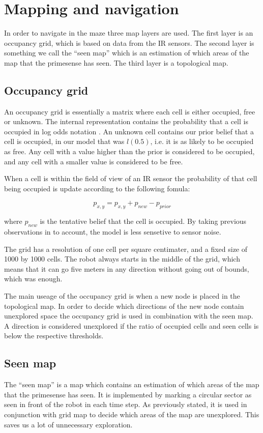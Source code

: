 \section{Mapping and navigation}
In order to navigate in the maze three map layers are used. The first layer is an occupancy grid, which is based on data from the IR sensors. The second layer is something we call the ``seen map'' which is an estimation of which areas of the map that the primesense has seen. The third layer is a topological map.

\subsection{Occupancy grid}
An occupancy grid is essentially a matrix where each cell is either occupied, free or unknown. 
The internal representation contains the probability that a cell is occupied in log odds notation \cite{wiki:Logit}.
An unknown cell contains our prior belief that a cell is occupied, in our model that was $l(0.5)$, i.e. it is as likely to be occupied as free. 
Any cell with a value higher than the prior is considered to be occupied, and any cell with a smaller value is considered to be free.

When a cell is within the field of view of an IR sensor the probability of that cell being occupied is update according to the following fomula:

\begin{equation}
p_{x, y} = p_{x, y} + p_{new} - p_{prior}
\end{equation}

where $p_{new}$ is the tentative belief that the cell is occupied. By taking previous observations in to account, the model is less sensetive to sensor noise. \cite{GridLecture}

The grid has a resolution of one cell per square centimater, and a fixed size of 1000 by 1000 cells. 
The robot always starts in the middle of the grid, which means that it can go five meters in any direction without going out of bounds, which was enough.

The main useage of the occupancy grid is when a new node is placed in the topological map. 
In order to decide which directions of the new node contain unexplored space the occupancy grid is used in combination with the seen map. 
A direction is considered unexplored if the ratio of occupied cells and seen cells is below the respective thresholds.

\subsection{Seen map}
The ``seen map'' is a map which contains an estimation of which areas of the map that the primesense has seen. 
It is implemented by marking a circular sector as seen in front of the robot in each time step. 
As previously stated, it is used in conjunction with grid map to decide which areas of the map are unexplored. 
This saves us a lot of unnecessary exploration.

